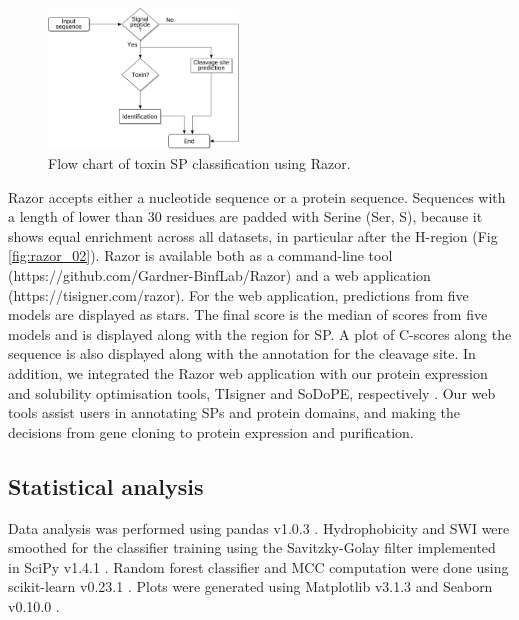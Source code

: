 \begin{figure}
  \begin{center}
    \includegraphics[width=0.45\textwidth]{chapters/Signal_Peptide/Figures/flowchart-fs8.png}
    \caption[Flow chart of toxin SP classification using Razor.]{Flow chart of toxin SP classification using Razor.
    }%
    \label{fig:razor_01}
  \end{center}
\end{figure}

Razor accepts either a nucleotide sequence or a protein sequence. Sequences with a length of lower than 30 residues are padded with Serine (Ser, S), because it shows equal enrichment across all datasets, in particular after the H-region (Fig \ref{fig:razor_02}). Razor is available both as a command-line tool (https://github.com/Gardner-BinfLab/Razor) and a web application (https://tisigner.com/razor). For the web application, predictions from five models are displayed as stars. The final score is the median of scores from five models and is displayed along with the region for SP. A plot of C-scores along the sequence is also displayed along with the annotation for the cleavage site. In addition, we integrated the Razor web application with our protein expression and solubility optimisation tools, TIsigner and SoDoPE, respectively \cite{Bhandari2020-pz,bhandari2019highly}. Our web tools assist users in annotating SPs and protein domains, and making the decisions from gene cloning to protein expression and purification.




\subsection{Statistical analysis}
Data analysis was performed using pandas v1.0.3 \cite{McKinney2010-rg}. Hydrophobicity and SWI were smoothed for the classifier training using the Savitzky-Golay filter implemented in SciPy v1.4.1 \cite{Virtanen2020-fq}. Random forest classifier and MCC computation were done using scikit-learn v0.23.1 \cite{Pedregosa2011-vs}. Plots were generated using Matplotlib v3.1.3 and Seaborn v0.10.0 \cite{Hunter2007-ii,Waskom2020-ye}.


